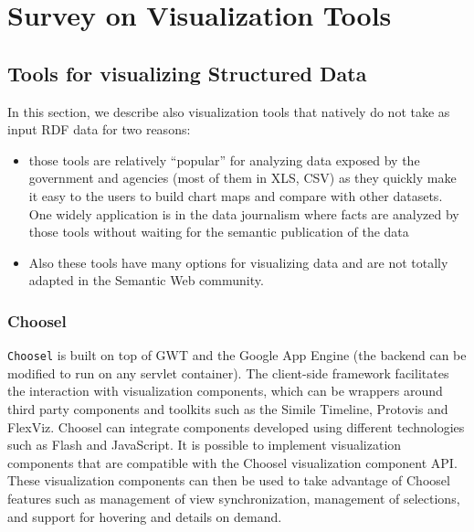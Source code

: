 
\section{Survey on Visualization Tools }
\label{sec:visu-soa}

\subsection{Tools for visualizing Structured Data}
\label{sec:strucdataviz}
In this section, we describe also visualization tools that natively do not take as input RDF data for two reasons: 
\begin{itemize}
\item those tools are relatively ``popular'' for analyzing data exposed by the government and agencies  (most of them in XLS, CSV) as they quickly make it easy to the users  to build chart  maps and compare with other datasets. One widely application is in the data journalism  where facts are analyzed by those tools without waiting for the semantic publication of the data 
\item Also these tools have many options for visualizing data and are not totally adapted in the Semantic Web community.

\end{itemize}

\subsubsection{Choosel}
\label{sec:choosel}

\texttt{Choosel} \cite{lars2010} is built on top of GWT  and the Google App Engine  (the backend can be modified to run on any servlet container). The client-side framework facilitates the interaction with visualization components, which can be wrappers around third party components and toolkits such as the Simile Timeline, Protovis and FlexViz. Choosel can integrate components developed using different technologies such as Flash and JavaScript. It is possible to implement visualization components that are compatible with the Choosel visualization component API. These visualization components can then be used to take advantage of Choosel features such as management of view synchronization, management of selections, and support for hovering and details on demand.

